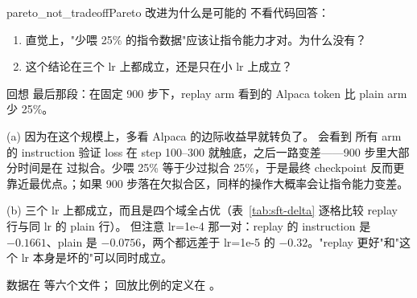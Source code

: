 \begin{checkpoint}{pareto_not_tradeoff}{Pareto 改进为什么是可能的}
不看代码回答：
\begin{enumerate}[label=(\alph*)]
  \item 直觉上，"少喂 25\% 的指令数据"应该让指令能力才对。为什么没有？
  \item 这个结论在三个 lr 上都成立，还是只在小 lr 上成立？
\end{enumerate}
\hint 回想  最后那段：在固定 900 步下，replay arm 看到的 Alpaca token
比 plain arm 少 25\%。

\ifshowanswers
\tcblower
\answer (a) 因为在这个规模上，多看 Alpaca 的边际收益早就转负了。 会看到
所有 arm 的 instruction 验证 loss 在 step 100--300 就触底，之后一路变差——900 步里大部分时间是在
过拟合。少喂 25\% 等于少过拟合 25\%，于是最终 checkpoint 反而更靠近最优点。；如果 900 步落在欠拟合区，同样的操作大概率会让指令能力变差。

(b) 三个 lr 上都成立，而且是四个域全占优（表~\ref{tab:sft-delta} 逐格比较 replay 行与同 lr 的 plain 行）。
但注意 lr=1e-4 那一对：replay 的 instruction 是 $-0.1661$、plain 是 $-0.0756$，两个都远差于
lr=1e-5 的 $-0.32$。"replay 更好"和"这个 lr 本身是坏的"可以同时成立。

\whereincode 数据在  等六个文件；
回放比例的定义在 。
\fi
\end{checkpoint}

